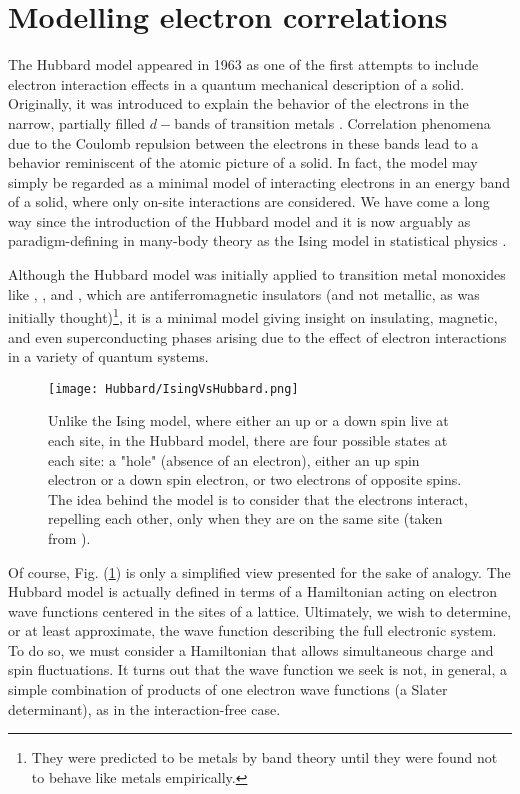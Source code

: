 \section{Modelling electron correlations}\label{sec:intro}

The Hubbard model appeared in 1963 as one of the first attempts to include electron interaction effects in a quantum mechanical description of a solid.
Originally, it was introduced to explain the behavior of the electrons in the narrow, partially filled $d-$bands of transition metals \cite{hubbard_electron_1963}.
Correlation phenomena due to the Coulomb repulsion between the electrons in these bands lead to a behavior reminiscent of the atomic picture of a solid.
In fact, the model may simply be regarded as a minimal model of interacting electrons in an energy band of a solid, where only on-site interactions are considered.
We have come a long way since the introduction of the Hubbard model and it is now arguably as paradigm-defining in many-body theory as the Ising model in statistical physics \cite{fazekas_lecture_1999, mahan_many-particle_2000, altland_condensed_2010}.

Although the Hubbard model was initially applied to transition metal monoxides like , , and , which are antiferromagnetic insulators (and not metallic, as was initially thought)\footnote{They were predicted to be metals by band theory until they were found not to behave like metals empirically.}, it is a minimal model giving insight on insulating, magnetic, and even superconducting phases arising due to the effect of electron interactions in a variety of quantum systems.

\begin{figure}[H]
	\centering
\texttt{[image: Hubbard/IsingVsHubbard.png]}
	\caption[Graphical comparison between the Ising and the Hubbard models.]{Unlike the Ising model, where either an up or a down spin live at each site, in the Hubbard model, there are four possible states at each site: a "hole" (absence of an electron), either an up spin electron or a down spin electron, or two electrons of opposite spins.
	The idea behind the model is to consider that the electrons interact, repelling each other, only when they are on the same site (taken from \cite{hayes_hip-hop_2009}).}
	\label{fig:IsingVsHubbard}
\end{figure}

Of course, Fig. (\ref{fig:IsingVsHubbard}) is only a simplified view presented for the sake of analogy.
The Hubbard model is actually defined in terms of a Hamiltonian acting on electron wave functions centered in the sites of a lattice.
Ultimately, we wish to determine, or at least approximate, the wave function describing the full electronic system.
To do so, we must consider a Hamiltonian that allows simultaneous charge and spin fluctuations.
It turns out that the wave function we seek is not, in general, a simple combination of products of one electron wave functions (a Slater determinant), as in the interaction-free case.

